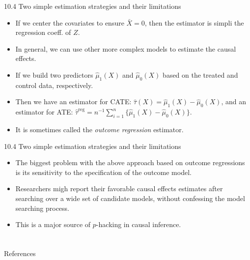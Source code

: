 \documentclass[aspectratio=169, 12pt]{beamer}
\begin{document}
\begin{frame}{10.4 Two simple estimation strategies and their limitations}
  \begin{itemize}
    \item If we center the covariates to ensure $\bar{X}=0$, then the estimator is simpli the regression coeff. of $Z$.
    \item In general, we can use other more complex models to estimate the causal effects.
    \item If we build two predictors $\hat{\mu}_1(X)$ and $\hat{\mu}_0(X)$ based on the treated and control data, respectively. 
    \item Then we have an estimator for CATE: $\hat{\tau}(X)=\hat{\mu}_1(X)-\hat{\mu}_0(X)$, and an estimator for ATE: $\hat{\tau}^{\text{reg}}=n^{-1}\sum_{i=1}^{n}\{\hat{\mu}_1(X)-\hat{\mu}_0(X)\}.$
    \item It is sometimes called the \textit{outcome regression} estimator.
  \end{itemize}
\end{frame}

\begin{frame}{10.4 Two simple estimation strategies and their limitations}
  \begin{itemize}
    \item The biggest problem with the above approach based on outcome regressions is its sensitivity to the specification of the outcome model.
    \item Researchers migh report their favorable causal effects estimates after searching over a wide set of candidate models, without confessing the model searching process.
    \item This is a major source of $p$-hacking in causal inference.
  \end{itemize}
\end{frame}



\section{}
\begin{frame}{References}
  \beamerdefaultoverlayspecification{}
  \small
  
\end{frame}
\end{document}
